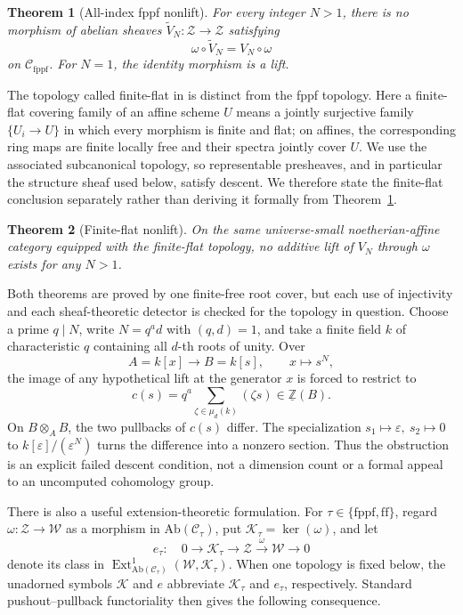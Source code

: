\documentclass[11pt]{article}
\newtheorem{theorem}{Theorem}[section]
\theoremstyle{definition}
\newcommand{\Ext}{\operatorname{Ext}}
\newcommand{\Zpre}{\underline{\mathbb Z}}
\newcommand{\Zsh}{\mathcal Z}
\newcommand{\Wsh}{\mathcal W}
\newcommand{\Ksh}{\mathcal K}
\newcommand{\ff}{\mathrm{ff}}
\newcommand{\fppf}{\mathrm{fppf}}
\begin{document}
\begin{theorem}[All-index fppf nonlift]\label{thm:fppf}
For every integer \(N>1\), there is no morphism of abelian sheaves
\(\widetilde V_N\colon\Zsh\to\Zsh\) satisfying
\[
 \omega\circ\widetilde V_N=V_N\circ\omega
\]
on \(\mathscr C_{\fppf}\).  For \(N=1\), the identity morphism is a lift.
\end{theorem}

The topology called finite-flat in
\cite[Sec.~4]{Deninger2025Rational} is distinct from the fppf topology.
Here a finite-flat covering family of an affine scheme \(U\) means a
jointly surjective family \(\{U_i\to U\}\) in which every morphism is finite
and flat; on affines, the corresponding ring maps are finite locally free
and their spectra jointly cover \(U\).  We use the associated subcanonical
topology, so representable presheaves, and in particular the structure
sheaf used below, satisfy descent.  We therefore state the finite-flat
conclusion separately rather than deriving it formally from
Theorem~\ref{thm:fppf}.

\begin{theorem}[Finite-flat nonlift]\label{thm:ff}
On the same universe-small noetherian-affine category equipped with the
finite-flat topology, no additive lift of \(V_N\) through \(\omega\) exists
for any \(N>1\).
\end{theorem}

Both theorems are proved by one finite-free root cover, but each use of
injectivity and each sheaf-theoretic detector is checked for the topology
in question.  Choose a prime \(q\mid N\), write \(N=q^a d\) with
\((q,d)=1\), and take a finite field \(k\) of characteristic \(q\)
containing all \(d\)-th roots of unity.  Over
\[
 A=k[x]\longrightarrow B=k[s],\qquad x\longmapsto s^N,
\]
the image of any hypothetical lift at the generator \(x\) is forced to
restrict to
\[
 c(s)=q^a\sum_{\zeta\in\mu_d(k)}(\zeta s)\in\Zpre(B).
\]
On \(B\otimes_A B\), the two pullbacks of \(c(s)\) differ.  The
specialization \(s_1\mapsto\varepsilon,\ s_2\mapsto0\) to
\(k[\varepsilon]/(\varepsilon^N)\) turns the difference into a nonzero
section.  Thus the obstruction is an explicit failed descent condition,
not a dimension count or a formal appeal to an uncomputed cohomology
group.

There is also a useful extension-theoretic formulation.  For
\(\tau\in\{\fppf,\ff\}\), regard \(\omega\colon\Zsh\to\Wsh\) as a morphism
in \(\mathrm{Ab}(\mathscr C_\tau)\), put
\(\Ksh_\tau=\ker(\omega)\), and let
\[
 e_\tau:\quad 0\longrightarrow\Ksh_\tau\longrightarrow\Zsh
 \xrightarrow{\omega}\Wsh\longrightarrow0
 \tag{1.1}\label{eq:extension}
\]
denote its class in
\(\Ext^1_{\mathrm{Ab}(\mathscr C_\tau)}(\Wsh,\Ksh_\tau)\).
When one topology is fixed below, the unadorned symbols \(\Ksh\) and \(e\)
abbreviate \(\Ksh_\tau\) and \(e_\tau\), respectively.  Standard
pushout--pullback functoriality then gives the following consequence.
\end{document}
